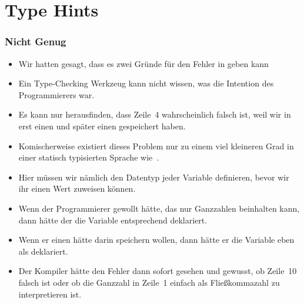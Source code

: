 \documentclass[aspectratio=169,mathserif,notheorems]{beamer}%
\begin{document}
%
\section{Type Hints}%
%
\begin{frame}%
\frametitle{Nicht Genug}%
\begin{itemize}%
\item Wir hatten gesagt, dass es zwei Gründe für den Fehler in  geben kann%
%
\item<4-> Ein Type-Checking Werkzeug kann nicht wissen, was die Intention des Programmierers war.%
\item<5-> Es kann nur herausfinden, dass Zeile~4 wahrscheinlich falsch ist, weil wir in  erst einen  und später einen  gespeichert haben.%
%
\item<7-> Komischerweise existiert dieses Problem nur zu einem viel kleineren Grad in einer statisch typisierten Sprache wie~.%
\item<8-> Hier müssen wir nämlich den Datentyp jeder Variable definieren, bevor wir ihr einen Wert zuweisen können.%
\item<9-> Wenn der Programmierer gewollt hätte, das  nur Ganzzahlen beinhalten kann, dann hätte der die Variable entsprechend deklariert.%
\item<10-> Wenn er einen  hätte darin speichern wollen, dann hätte er die Variable eben als  deklariert.%
\item<11-> Der Kompiler hätte den Fehler dann sofort gesehen und gewusst, ob Zeile~10 falsch ist oder ob die Ganzzahl in Zeile~1 einfach als Fließkommazahl zu interpretieren ist.%
\end{itemize}%
%
\end{frame}%
%
\end{document}
